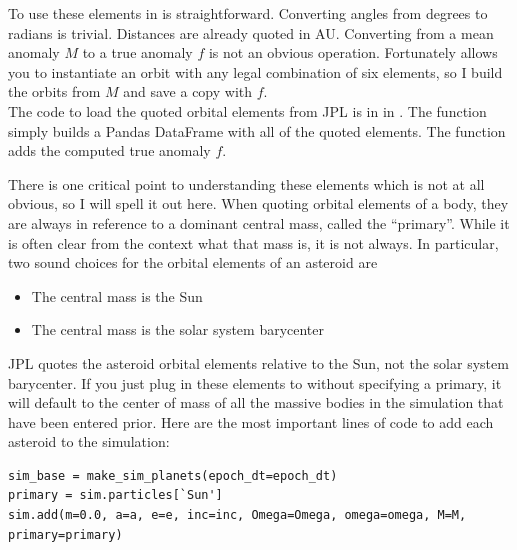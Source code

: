To use these elements in  is straightforward.
Converting angles from degrees to radians is trivial.
Distances are already quoted in AU.
Converting from a mean anomaly $M$ to a true anomaly $f$ is not an obvious operation.
Fortunately  allows you to instantiate an orbit with any legal combination of six elements,
so I build the orbits from $M$ and save a copy with $f$. \\
The code to load the quoted orbital elements from JPL is in  in .
The function  simply builds a Pandas DataFrame with all of the quoted elements.
The function  adds the computed true anomaly $f$.

There is one critical point to understanding these elements which is not at all obvious, so I will spell it out here.
When quoting orbital elements of a body, they are always in reference to a dominant central mass, called the ``primary''.
While it is often clear from the context what that mass is, it is not always.
In particular, two sound choices for the orbital elements of an asteroid are
\begin{samepage}
\begin{itemize}
\item The central mass is the Sun
\item The central mass is the solar system barycenter
\end{itemize}
\end{samepage}
JPL quotes the asteroid orbital elements relative to the Sun, not the solar system barycenter.
If you just plug in these elements to  without specifying a primary, 
it will default to the center of mass of all the massive bodies in the simulation that have been entered prior.
Here are the most important lines of code to add each asteroid to the simulation:
\begin{lstlisting}[style=CodeSnippet]
sim_base = make_sim_planets(epoch_dt=epoch_dt)
primary = sim.particles[`Sun']
sim.add(m=0.0, a=a, e=e, inc=inc, Omega=Omega, omega=omega, M=M, primary=primary)
\end{lstlisting}

